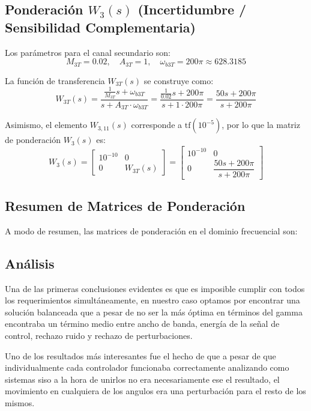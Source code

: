 \documentclass[11pt,letterpaper]{article}
\numberwithin{equation}{section}
\begin{document}
\subsection{Ponderación $W_3(s)$ (Incertidumbre / Sensibilidad Complementaria)}
Los parámetros para el canal secundario son:
\begin{equation}
M_{3T} = 0.02, \quad A_{3T} = 1, \quad \omega_{b3T} = 200\pi \approx 628.3185
\end{equation}

La función de transferencia $W_{3T}(s)$ se construye como:
\begin{equation}
W_{3T}(s) = \frac{\frac{1}{M_{3T}} s + \omega_{b3T}}{s + A_{3T} \cdot \omega_{b3T}} = \frac{\frac{1}{0.02} s + 200\pi}{s + 1 \cdot 200\pi} = \frac{50 s + 200\pi}{s + 200\pi}
\end{equation}

Asimismo, el elemento $W_{3,11}(s)$ corresponde a $\text{tf}(10^{-5})$, por lo que la matriz de ponderación $W_3(s)$ es:
\begin{equation}
W_3(s) = \begin{bmatrix} 10^{-10} & 0 \\ 0 & W_{3T}(s) \end{bmatrix} = \begin{bmatrix} 10^{-10} & 0 \\[6pt] 0 & \dfrac{50s + 200\pi}{s + 200\pi} \end{bmatrix}
\end{equation}

\subsection{Resumen de Matrices de Ponderación}

A modo de resumen, las matrices de ponderación en el dominio frecuencial son:

\subsection{Análisis}

Una de las primeras conclusiones evidentes es que es imposible cumplir con todos los requerimientos simultáneamente, en nuestro caso optamos por encontrar una solución balanceada que a pesar de no ser la más óptima en términos del gamma encontraba un término medio entre ancho de banda, energía de la señal de control, rechazo ruido y rechazo de perturbaciones.

Uno de los resultados más interesantes fue el hecho de que a pesar de que individualmente cada controlador funcionaba correctamente analizando como sistemas siso a la hora de unirlos no era necesariamente ese el resultado, el movimiento en cualquiera de los angulos era una perturbación para el resto de los mismos.
\end{document}
